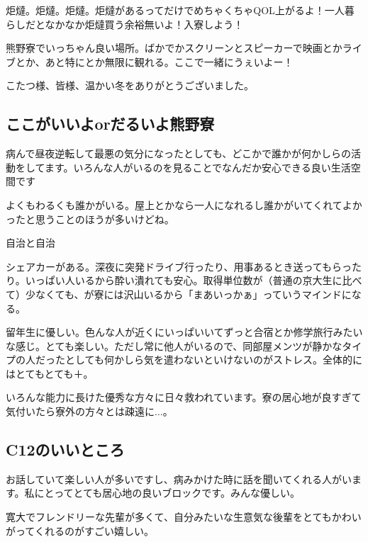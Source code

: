 \begin{multicols}{2}
  炬燵。炬燵。炬燵。炬燵があるってだけでめちゃくちゃQOL上がるよ！一人暮らしだとなかなか炬燵買う余裕無いよ！入寮しよう！

  熊野寮でいっちゃん良い場所。ばかでかスクリーンとスピーカーで映画とかライブとか、あと特にとか無限に観れる。ここで一緒にうぇいよー！

  こたつ様、皆様、温かい冬をありがとうございました。



  \subsection{ここがいいよorだるいよ熊野寮}

  病んで昼夜逆転して最悪の気分になったとしても、どこかで誰かが何かしらの活動をしてます。いろんな人がいるのを見ることでなんだか安心できる良い生活空間です

  よくもわるくも誰かがいる。屋上とかなら一人になれるし誰かがいてくれてよかったと思うことのほうが多いけどね。

  自治と自治

  シェアカーがある。深夜に突発ドライブ行ったり、用事あるとき送ってもらったり。いっぱい人いるから酔い潰れても安心。取得単位数が（普通の京大生に比べて）少なくても、が寮には沢山いるから「まあいっかぁ」っていうマインドになる。

  留年生に優しい。色んな人が近くにいっぱいいてずっと合宿とか修学旅行みたいな感じ。とても楽しい。ただし常に他人がいるので、同部屋メンツが静かなタイプの人だったとしても何かしら気を遣わないといけないのがストレス。全体的にはとてもとても＋。

  いろんな能力に長けた優秀な方々に日々救われています。寮の居心地が良すぎて気付いたら寮外の方々とは疎遠に...。





  \subsection{C12のいいところ}

  お話していて楽しい人が多いですし、病みかけた時に話を聞いてくれる人がいます。私にとってとても居心地の良いブロックです。みんな優しい。

  寛大でフレンドリーな先輩が多くて、自分みたいな生意気な後輩をとてもかわいがってくれるのがすごい嬉しい。


\end{multicols}
